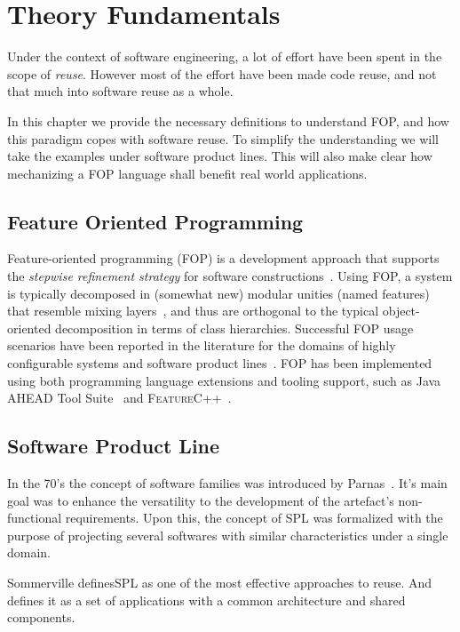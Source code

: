 \chapter{Theory Fundamentals}
Under the context of software engineering, a lot of effort have been spent in the scope of \textit{reuse}.
However most of the effort have been made code reuse, and not that much into software reuse as a whole.

In this chapter we provide the necessary definitions to understand \gls{FOP},
and how this paradigm copes with software reuse.
To simplify the understanding we will take the examples under software product lines.
This will also make clear how mechanizing a \gls{FOP} language shall benefit real world applications.


\section{Feature Oriented Programming}\label{seq:fop}

Feature-oriented programming (FOP) is a development approach 
that supports the \emph{stepwise refinement strategy} for software 
constructions~\cite{batory-tse2004}. Using FOP, a system is 
typically decomposed in (somewhat new) modular unities 
(named features) that resemble mixing layers~\cite{bracha-ecoop1990}, 
and thus are orthogonal to the typical object-oriented 
decomposition in terms of class hierarchies. 
Successful FOP usage scenarios have been reported in the literature 
for the domains of highly configurable systems and
software product lines~\cite{}.  
FOP has been implemented using both programming 
language extensions and tooling support, such as 
Java AHEAD Tool Suite~\cite{batory_feature-oriented_2004} and \textsc{FeatureC++}~\cite{apel_featurec++:_2005}. 


\section{Software Product Line}
In the 70's the concept of software families was introduced by Parnas~\cite{parnas1976design}. 
It's main goal was to enhance the versatility to the development of the artefact's 
non-functional requirements. Upon this, the concept of \gls{SPL}
was formalized with the purpose of projecting several softwares
with similar characteristics under a single domain.

Sommerville\cite{Sommerville:2010:SE:1841764} defines\gls{SPL} as one of the most effective approaches to reuse.
And defines it as a set of applications with a common architecture and shared components.

